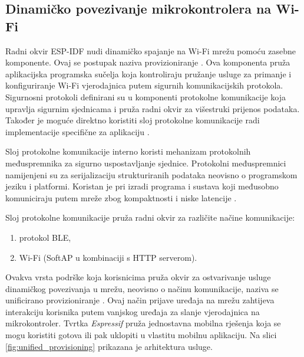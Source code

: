 \subsection{Dinamičko povezivanje mikrokontrolera na Wi-Fi}

Radni okvir ESP-IDF nudi dinamičko spajanje na Wi-Fi mrežu pomoću zasebne komponente. Ovaj se postupak naziva provizioniranje . Ova komponenta pruža aplikacijska programska sučelja  koja kontroliraju pružanje usluge za primanje i konfiguriranje Wi-Fi vjerodajnica putem sigurnih komunikacijskih protokola. Sigurnosni protokoli definirani su u komponenti protokolne komunikacije  koja upravlja sigurnim sjednicama  i pruža radni okvir za višestruki prijenos podataka. Također je moguće direktno koristiti sloj protokolne komunikacije radi implementacije specifične za aplikaciju \cite{unified_provisioning}.

Sloj protokolne komunikacije interno koristi mehanizam protokolnih međuspremnika  za sigurno uspostavljanje sjednice. Protokolni međuspremnici namijenjeni su za serijalizaciju strukturiranih podataka neovisno o programskom jeziku i platformi. Koristan je pri izradi programa i sustava koji međusobno komuniciraju putem mreže zbog kompaktnosti i niske latencije \cite{what_is_protobuf}.

Sloj protokolne komunikacije pruža radni okvir za različite načine komunikacije:
\begin{enumerate}
	\item protokol BLE,
	\item Wi-Fi (SoftAP u kombinaciji s HTTP serverom).
\end{enumerate}

Ovakva vrsta podrške koja korisnicima pruža okvir za ostvarivanje usluge dinamičkog povezivanja u mrežu, neovisno o načinu komunikacije, naziva se unificirano provizioniranje . Ovaj način prijave uređaja na mrežu zahtijeva interakciju korisnika putem vanjskog uređaja za slanje vjerodajnica na mikrokontroler. Tvrtka \textit{Espressif} pruža jednostavna mobilna rješenja koja se mogu koristiti gotova ili pak uklopiti u vlastitu mobilnu aplikaciju. Na slici \ref{fig:unified_provisioning} prikazana je arhitektura usluge.

